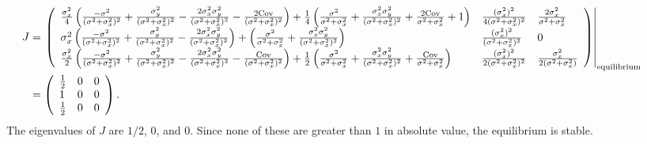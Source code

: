 \documentclass{article}
\newcommand{\Cov}{\text{Cov}}
\begin{document}
\begin{enumerate}
\begin{align*}
\hspace{-60pt}J&=\left.\left(\begin{array}{lll} 
\frac{\sigma_x^2}{4}\left(\frac{-\sigma^2}{(\sigma^2+\sigma_x^2)^2}+\frac{\sigma_y^2}{(\sigma^2+\sigma_x^2)^2}-\frac{2\sigma_x^2\sigma_y^2}{(\sigma^2+\sigma_x^2)^3}-\frac{2\Cov}{(\sigma^2+\sigma_x^2)^2}\right)+\frac{1}{4}\left(\frac{\sigma^2}{\sigma^2+\sigma_x^2}+\frac{\sigma_x^2\sigma_y^2}{(\sigma^2+\sigma_x^2)^2}+\frac{2\Cov}{\sigma^2+\sigma_x^2}+1\right) & \frac{(\sigma_x^2)^2}{4(\sigma^2+\sigma_x^2)^2} & \frac{2\sigma_x^2}{\sigma^2+\sigma_x^2}
\\ \sigma_x^2\left(\frac{-\sigma^2}{(\sigma^2+\sigma_x^2)^2}+\frac{\sigma_y^2}{(\sigma^2+\sigma_x^2)^2}-\frac{2\sigma_x^2\sigma_y^2}{(\sigma^2+\sigma_x^2)^3}\right)+\left(\frac{\sigma^2}{\sigma^2+\sigma_x^2}+\frac{\sigma_x^2\sigma_y^2}{(\sigma^2+\sigma_x^2)^2}\right) & \frac{(\sigma_x^2)^2}{(\sigma^2+\sigma_x^2)^2} & 0 
\\ \frac{\sigma_x^2}{2}\left(\frac{-\sigma^2}{(\sigma^2+\sigma_x^2)^2}+\frac{\sigma_y^2}{(\sigma^2+\sigma_x^2)^2}-\frac{2\sigma_x^2\sigma_y^2}{(\sigma^2+\sigma_x^2)^3}-\frac{\Cov}{(\sigma^2+\sigma_x^2)^2}\right)+\frac{1}{2}\left(\frac{\sigma^2}{\sigma^2+\sigma_x^2}+\frac{\sigma_x^2\sigma_y^2}{(\sigma^2+\sigma_x^2)^2}+\frac{\Cov}{\sigma^2+\sigma_x^2}\right) & \frac{(\sigma_x^2)^2}{2(\sigma^2+\sigma_x^2)^2} & \frac{\sigma_x^2}{2(\sigma^2+\sigma_x^2)}
\end{array}\right)\right|_\text{equilibrium}
\\\hspace{-20pt}&=\left(\begin{array}{lll} 
\frac{1}{2} & 0 & 0 
\\ 1 & 0 & 0 
\\ \frac{1}{2} & 0 & 0 
\end{array}\right).
\end{align*}
The eigenvalues of $J$ are $1/2$, $0$, and $0$. Since none of these are greater than $1$ in absolute value, the equilibrium is stable.


\end{enumerate}
\end{document}
